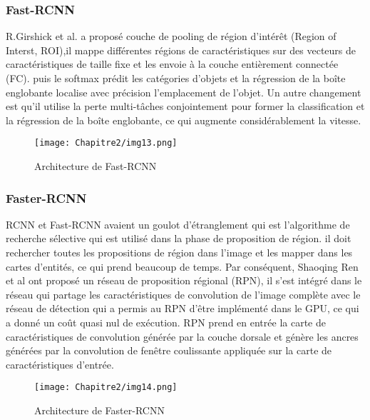      \subsubsection{Fast-RCNN} \cite{fast_rcnn_paper}
     R.Girshick et al. a proposé couche de pooling de région d'intérêt (Region of Interst, ROI),il mappe différentes régions de caractéristiques sur des vecteurs de caractéristiques de taille fixe et les envoie à la couche entièrement connectée (FC). puis le softmax prédit les catégories d'objets et la régression de la boîte englobante localise avec précision l'emplacement de l'objet. Un autre changement est qu'il utilise la perte multi-tâches conjointement pour former la classification et la régression de la boîte englobante, ce qui augmente considérablement la vitesse.
     \begin{figure}[H]
          \centering
          \texttt{[image: Chapitre2/img13.png]}
          \caption{Architecture de Fast-RCNN}
          \label{img13}
          \end{figure}

     \subsubsection{Faster-RCNN} \cite{faster_rcnn_paper}
     RCNN et Fast-RCNN avaient un goulot d'étranglement qui est l'algorithme de recherche sélective qui est utilisé dans la phase de proposition de région. il doit rechercher toutes les propositions de région dans l'image et les mapper dans les cartes d'entités, ce qui prend beaucoup de temps. Par conséquent, Shaoqing Ren et al ont proposé un réseau de proposition régional (RPN), il s'est intégré dans le réseau qui partage les caractéristiques de convolution de l'image complète avec le réseau de détection qui a permis au RPN d'être implémenté dans le GPU, ce qui a donné un coût quasi nul de exécution. RPN prend en entrée la carte de caractéristiques de convolution générée par la couche dorsale et génère les ancres générées par la convolution de fenêtre coulissante appliquée sur la carte de caractéristiques d'entrée.
     \begin{figure}[H]
          \centering
          \texttt{[image: Chapitre2/img14.png]}
          \caption{Architecture de Faster-RCNN}
          \label{img14}
          \end{figure}

